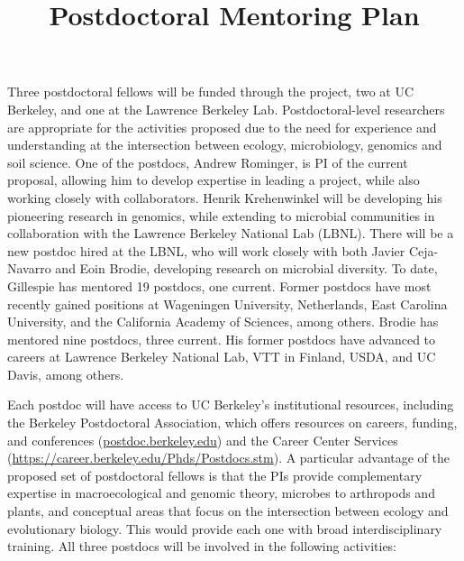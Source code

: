 \documentclass[11pt]{article}
\title{Postdoctoral Mentoring Plan \vspace{-1.5ex}}
\author{}
\date{}
\begin{document}
\maketitle
\thispagestyle{fancy} 
\vspace{-4em}

Three postdoctoral fellows will be funded through the project, two at
UC Berkeley, and one at the Lawrence Berkeley Lab. Postdoctoral-level
researchers are appropriate for the activities proposed due to the
need for experience and understanding at the intersection between
ecology, microbiology, genomics and soil science. One of the postdocs,
Andrew Rominger, is PI of the current proposal, allowing him to
develop expertise in leading a project, while also working closely
with collaborators. Henrik Krehenwinkel will be developing his
pioneering research in genomics, while extending to microbial
communities in collaboration with the Lawrence Berkeley National Lab
(LBNL). There will be a new postdoc hired at the LBNL, who will work
closely with both Javier Ceja-Navarro and Eoin Brodie, developing
research on microbial diversity. To date, Gillespie has mentored 19
postdocs, one current. Former postdocs have most recently gained
positions at Wageningen University, Netherlands, East Carolina
University, and the California Academy of Sciences, among
others. Brodie has mentored nine postdocs, three current. His former
postdocs have advanced to careers at Lawrence Berkeley National Lab,
VTT in Finland, USDA, and UC Davis, among others.

Each postdoc will have access to UC Berkeley's institutional
resources, including the Berkeley Postdoctoral Association, which
offers resources on careers, funding, and conferences
(\url{postdoc.berkeley.edu}) and the Career Center Services
(\url{https://career.berkeley.edu/Phds/Postdocs.stm}). A particular
advantage of the proposed set of postdoctoral fellows is that the PIs
provide complementary expertise in macroecological and genomic theory,
microbes to arthropods and plants, and conceptual areas that focus on
the intersection between ecology and evolutionary biology. This would
provide each one with broad interdisciplinary training. All three
postdocs will be involved in the following activities:
\end{document}
